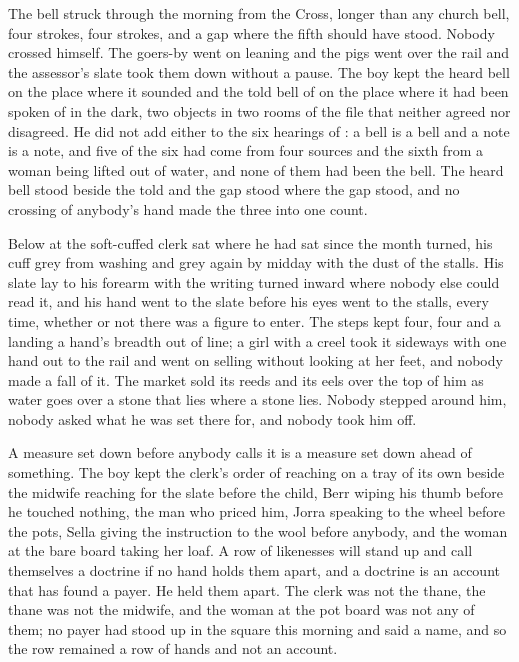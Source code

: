 The bell struck through the morning from the Cross, longer than any church bell, four strokes, four strokes, and a gap where the fifth should have stood. Nobody crossed himself. The goers-by went on leaning and the pigs went over the rail and the assessor's slate took them down without a pause. The boy kept the heard bell on the place where it sounded and the told bell of  on the place where it had been spoken of in the dark, two objects in two rooms of the file that neither agreed nor disagreed. He did not add either to the six hearings of : a bell is a bell and a note is a note, and five of the six had come from four sources and the sixth from a woman being lifted out of water, and none of them had been the bell. The heard bell stood beside the told and the gap stood where the gap stood, and no crossing of anybody's hand made the three into one count.

Below  at  the soft-cuffed clerk sat where he had sat since the month turned, his cuff grey from washing and grey again by midday with the dust of the stalls. His slate lay to his forearm with the writing turned inward where nobody else could read it, and his hand went to the slate before his eyes went to the stalls, every time, whether or not there was a figure to enter. The steps kept four, four and a landing a hand's breadth out of line; a girl with a creel took it sideways with one hand out to the rail and went on selling without looking at her feet, and nobody made a fall of it. The market sold its reeds and its eels over the top of him as water goes over a stone that lies where a stone lies. Nobody stepped around him, nobody asked what he was set there for, and nobody took him off.

A measure set down before anybody calls it is a measure set down ahead of something. The boy kept the clerk's order of reaching on a tray of its own beside the midwife reaching for the slate before the child, Berr wiping his thumb before he touched nothing, the man who priced him, Jorra speaking to the wheel before the pots, Sella giving the instruction to the wool before anybody, and the woman at the bare board taking her loaf. A row of likenesses will stand up and call themselves a doctrine if no hand holds them apart, and a doctrine is an account that has found a payer. He held them apart. The clerk was not the thane, the thane was not the midwife, and the woman at the pot board was not any of them; no payer had stood up in the square this morning and said a name, and so the row remained a row of hands and not an account.

